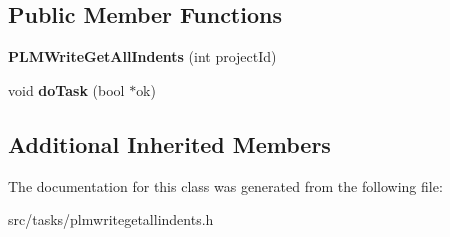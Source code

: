 \subsection*{Public Member Functions}
\begin{DoxyCompactItemize}
\item 
{\bfseries P\+L\+M\+Write\+Get\+All\+Indents} (int project\+Id)\hypertarget{class_p_l_m_write_get_all_indents_a6df034e7206f4009cb8e66456d4c878c}{}\label{class_p_l_m_write_get_all_indents_a6df034e7206f4009cb8e66456d4c878c}

\item 
void {\bfseries do\+Task} (bool $\ast$ok)\hypertarget{class_p_l_m_write_get_all_indents_a49f8c56451f23d8ffbb1b58df9c18007}{}\label{class_p_l_m_write_get_all_indents_a49f8c56451f23d8ffbb1b58df9c18007}

\end{DoxyCompactItemize}
\subsection*{Additional Inherited Members}


The documentation for this class was generated from the following file\+:\begin{DoxyCompactItemize}
\item 
src/tasks/plmwritegetallindents.\+h\end{DoxyCompactItemize}
